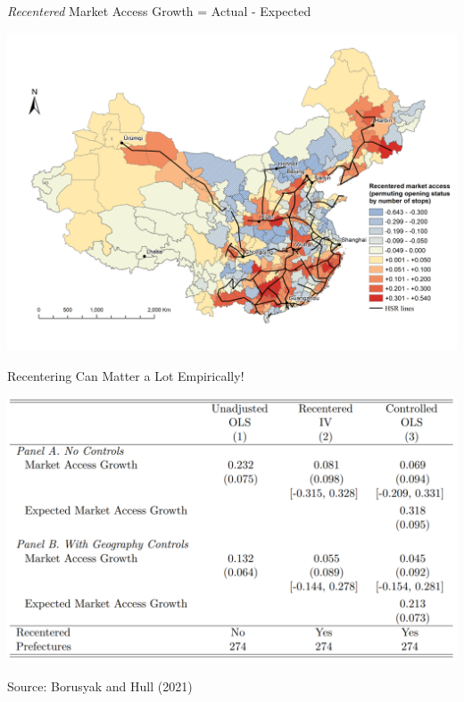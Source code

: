 \documentclass{beamer}
\begin{document}
\begin{frame}{\emph{Recentered} Market Access Growth = Actual - Expected}
\vspace{-1cm}
\begin{center}
\includegraphics[scale=0.4]{./lecture_includes/NlinkRecentered2016.png}
\end{center}

\end{frame}

\begin{frame}{Recentering Can Matter a Lot Empirically!}

\begin{center}
\includegraphics[scale=0.5]{./lecture_includes/hsr_tab.png}
\end{center}
Source: Borusyak and Hull (2021)
\end{frame}
\end{document}
